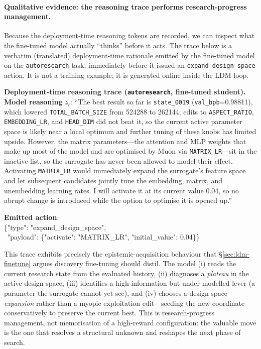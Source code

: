\paragraph{Qualitative evidence: the reasoning trace performs research-progress management.}
Because the deployment-time reasoning tokens are recorded, we can inspect what the fine-tuned model actually
``thinks'' before it acts. The trace below is a verbatim (translated) deployment-time rationale emitted by the
fine-tuned model on the \texttt{autoresearch} task, immediately before it issued an
\texttt{expand\_design\_space} action. It is not a training example; it is generated online inside the LDM loop.

\begin{tcolorbox}[
    enhanced,
    breakable,
    colframe=discgreenline,
    colback=discgreen!18,
    boxrule=0.9pt,
    arc=4pt,
    left=8pt,
    right=8pt,
    top=7pt,
    bottom=7pt
]
{\bfseries Deployment-time reasoning trace (\texttt{autoresearch}, fine-tuned student).}\\[2pt]
\small
{\bfseries Model reasoning} $z_t$: ``The best result so far is \texttt{state\_0019} (\texttt{val\_bpb}=0.98811),
which lowered \texttt{TOTAL\_BATCH\_SIZE} from 524288 to 262144; edits to \texttt{ASPECT\_RATIO},
\texttt{EMBEDDING\_LR}, and \texttt{HEAD\_DIM} did not beat it, so the current active parameter space is likely
near a local optimum and further tuning of these knobs has limited upside. However, the matrix parameters---the
attention and MLP weights that make up most of the model and are optimised by Muon via \texttt{MATRIX\_LR}---sit
in the inactive list, so the surrogate has never been allowed to model their effect. Activating \texttt{MATRIX\_LR}
would immediately expand the surrogate's feature space and let subsequent candidates jointly tune the embedding,
matrix, and unembedding learning rates. I will activate it at its current value 0.04, so no abrupt change is
introduced while the option to optimise it is opened up.''

\smallskip
{\bfseries Emitted action}:\\
{\ttfamily\scriptsize \{"type": "expand\_design\_space",}\\
{\ttfamily\scriptsize \ "payload": \{"activate": "MATRIX\_LR", "initial\_value": 0.04\}\}}
\end{tcolorbox}

This trace exhibits precisely the epistemic-acquisition behaviour that \S\ref{sec:ldm-finetune} argues discovery
fine-tuning should distil. The model (i) reads the current research state from the evaluated history, (ii)
diagnoses a \emph{plateau} in the active design space, (iii) identifies a high-information but under-modelled
lever (a parameter the surrogate cannot yet see), and (iv) chooses a design-space \emph{expansion} rather than a
myopic exploitation edit---seeding the new coordinate conservatively to preserve the current best. This is
research-progress management, not memorisation of a high-reward configuration: the valuable move is the one that
resolves a structural unknown and reshapes the next phase of search.

